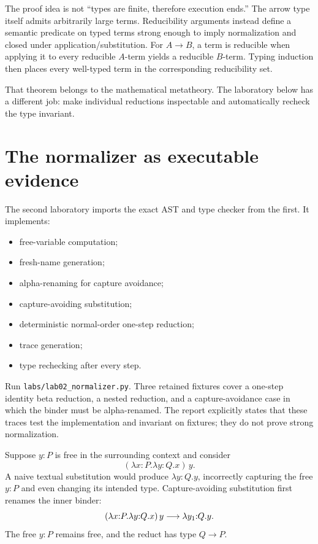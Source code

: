 The proof idea is not “types are finite, therefore execution ends.” The arrow type itself admits arbitrarily large terms. Reducibility arguments instead define a semantic predicate on typed terms strong enough to imply normalization and closed under application/substitution. For $A\to B$, a term is reducible when applying it to every reducible $A$-term yields a reducible $B$-term. Typing induction then places every well-typed term in the corresponding reducibility set.

That theorem belongs to the mathematical metatheory. The laboratory below has a different job: make individual reductions inspectable and automatically recheck the type invariant.

\section{The normalizer as executable evidence}

The second laboratory imports the exact AST and type checker from the first. It implements:

\begin{itemize}
\item free-variable computation;
\item fresh-name generation;
\item alpha-renaming for capture avoidance;
\item capture-avoiding substitution;
\item deterministic normal-order one-step reduction;
\item trace generation;
\item type rechecking after every step.
\end{itemize}

\begin{labbox}
Run \texttt{labs/lab02\_normalizer.py}. Three retained fixtures cover a one-step identity beta reduction, a nested reduction, and a capture-avoidance case in which the binder must be alpha-renamed. The report explicitly states that these traces test the implementation and invariant on fixtures; they do not prove strong normalization.
\end{labbox}

\begin{workedexample}[title={Worked Example: capture avoidance}]
Suppose $y:P$ is free in the surrounding context and consider
\[
 (\lambda x{:}P.\lambda y{:}Q.x)\,y.
\]
A naive textual substitution would produce $\lambda y{:}Q.y$, incorrectly capturing the free $y:P$ and even changing its intended type. Capture-avoiding substitution first renames the inner binder:
\[
 (\lambda x{:}P.\lambda y{:}Q.x)\,y
 \mathrel{\longrightarrow}
 \lambda y_1{:}Q.y.
\]
The free $y:P$ remains free, and the reduct has type $Q\to P$.
\end{workedexample}

